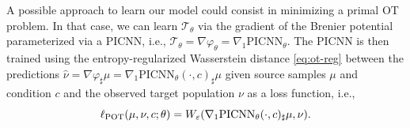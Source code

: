 A possible approach to learn our model could consist in minimizing a primal OT problem. In that case, we can learn $\mathcal{T}_{\theta}$ via the gradient of the Brenier potential parameterized via a PICNN, i.e., $\mathcal{T}_{\theta} = \nabla \varphi_{\theta} = \nabla_1 \text{PICNN}_\theta$.
The PICNN is then trained using the entropy-regularized Wasserstein distance \eqref{eq:ot-reg} between the predictions $\hat{\nu} = \nabla \varphi _\sharp \mu = \nabla_1 \text{PICNN}_\theta (\cdot, c)_\sharp \mu$ given source samples $\mu$ and condition $c$ and the observed target population $\nu$ as a loss function, i.e.,
\begin{equation} \label{eq:pot_loss}
    \ell_\text{POT}(\mu, \nu, c; \theta) = W_{\varepsilon}(\nabla_1 \text{PICNN}_\theta (\cdot, c)_\sharp\mu,\nu).
\end{equation}

